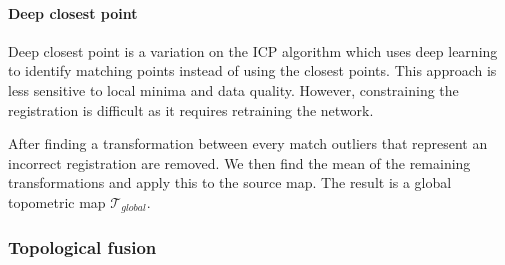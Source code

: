 \paragraph{Deep closest point}
Deep closest point is a variation on the ICP algorithm which uses deep learning to identify matching points instead of using the closest points. This approach is less sensitive to local minima and data quality. However, constraining the registration is difficult as it requires retraining the network.

After finding a transformation between every match outliers that represent an incorrect registration are removed. We then find the mean of the remaining transformations and apply this to the source map. The result is a global topometric map \(\mathcal{T}_{global}\).

\subsubsection{Topological fusion}

